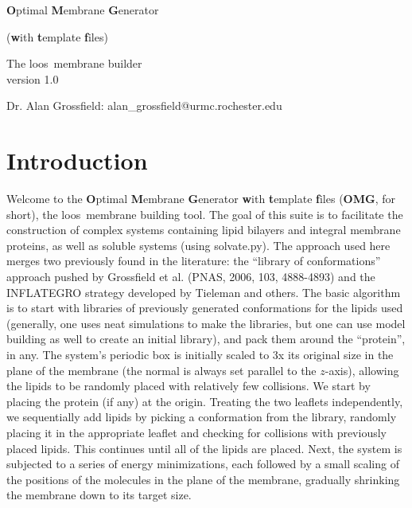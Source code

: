 \documentclass[12pt]{article}
\begin{document}
\newcommand{\loos}{{\sc loos}}
\newcommand{\pyloos}{{\sc PyLoos}}
\newcommand{\namd}{{\sc namd}}
\newcommand{\psfgen}{{\tt psfgen}}
\newcommand{\omgwtf}{{\bf OMG}}
\newcommand{\highlight}[1]{\textcolor{red}{#1}}


\begin{center}
\begin{LARGE}
{\bf O}ptimal {\bf M}embrane {\bf G}enerator \\
\end{LARGE}
\begin{Large}
({\bf w}ith  {\bf t}emplate {\bf f}iles) \\
\end{Large}
\vspace*{0.25in}
\begin{large}
The \loos\ membrane builder \\
version 1.0 \\
\end{large}

\vspace*{0.5in}
Dr. Alan Grossfield: alan\_grossfield@urmc.rochester.edu \\
\end{center}

\newpage

\tableofcontents
\newpage

\section{Introduction}
\label{s:intro}

Welcome to the {\bf O}ptimal {\bf M}embrane {\bf G}enerator {\bf w}ith {\bf
t}emplate {\bf f}iles (\omgwtf, for short), the \loos\ membrane building tool.
The goal of this suite is to facilitate the construction of complex systems
containing lipid bilayers and integral membrane proteins, as well as soluble
systems (using solvate.py).  The approach used here merges two previously found
in the literature:
the ``library of conformations'' approach pushed by Grossfield et al. (PNAS,
2006, 103, 4888-4893) and the INFLATEGRO strategy developed by Tieleman and
others.  The basic algorithm is to start with libraries of previously generated
conformations for the lipids used (generally, one uses neat simulations to make
the libraries, but one can use model building as well to create an initial
library), and pack them around the ``protein'', in any.  The system's periodic
box is initially scaled to 3x its original size in the plane of the membrane
(the normal is always set parallel to the $z$-axis), allowing the lipids to be
randomly placed with relatively few collisions.  We start by placing the protein
(if any) at the origin. Treating the two leaflets independently, we sequentially
add lipids by picking a conformation from the library, randomly placing it in
the appropriate leaflet and checking for collisions with previously placed
lipids.  This continues until all of the lipids are placed.  Next, the system is
subjected to a series of energy minimizations, each followed by a small scaling
of the positions of the molecules in the plane of the membrane, gradually
shrinking the membrane down to its target size.
\end{document}
